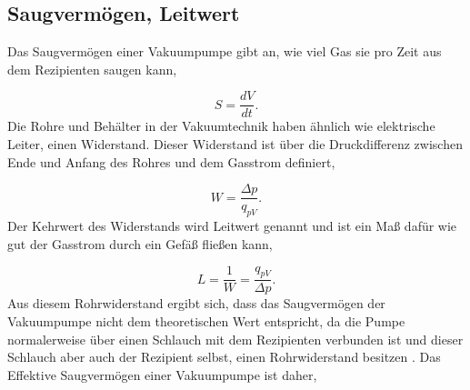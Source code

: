 \subsection{Saugvermögen, Leitwert}
\label{sec:Saugvermögen}
Das Saugvermögen einer Vakuumpumpe gibt an, wie viel Gas sie pro Zeit aus dem Rezipienten saugen kann,

    \begin{equation}
    \label{equ:4}
        S = \frac{dV}{dt}.
    \end{equation}
Die Rohre und Behälter in der Vakuumtechnik haben ähnlich wie elektrische Leiter, einen Widerstand.
Dieser Widerstand ist über die Druckdifferenz zwischen Ende und Anfang des Rohres und dem Gasstrom definiert,

    \begin{equation}
    \label{equ:5}
        W = \frac{\Delta p}{q_{pV}}.
    \end{equation}
Der Kehrwert des Widerstands wird Leitwert genannt und ist ein Maß dafür wie gut der Gasstrom durch ein Gefäß fließen kann,

    \begin{equation}
    \label{equ:6}
        L = \frac{1}{W} = \frac{q_{pV}}{\Delta p}.
    \end{equation}
Aus diesem Rohrwiderstand ergibt sich, dass das Saugvermögen der Vakuumpumpe nicht dem theoretischen Wert entspricht, 
da die Pumpe normalerweise über einen Schlauch mit dem Rezipienten verbunden ist und dieser Schlauch aber auch der Rezipient selbst, 
einen Rohrwiderstand besitzen \cite{Buch, S82}.
Das Effektive Saugvermögen einer Vakuumpumpe ist daher,

